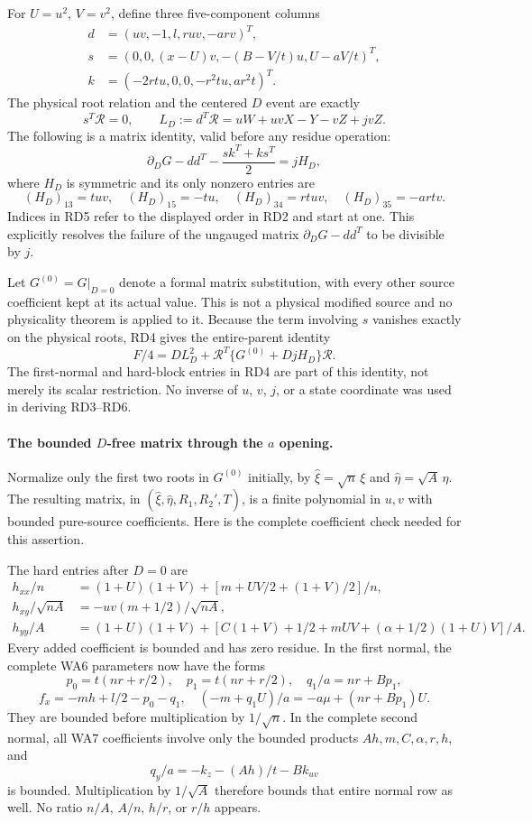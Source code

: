 For $U=u^2$, $V=v^2$, define three five-component columns
\begin{align*}
 d&=(uv,-1,l,ruv,-arv)^T,\\
 s&=(0,0,(x-U)v,-(B-V/t)u,U-aV/t)^T,\\
 k&=(-2rtu,0,0,-r^2tu,ar^2t)^T.
\end{align*}
The physical root relation and the centered $D$ event are exactly
\[
 s^T\mathcal R=0,\qquad
 L_D:=d^T\mathcal R
   =uW+uvX-Y-vZ+jvZ.                               \tag{RD3}
\]
The following is a matrix identity, valid before any residue operation:
\[
 \partial_DG-dd^T-\frac{sk^T+ks^T}{2}=jH_D,        \tag{RD4}
\]
where $H_D$ is symmetric and its only nonzero entries are
\[
 (H_D)_{13}=tuv,\quad (H_D)_{15}=-tu,\quad
 (H_D)_{34}=rtuv,\quad (H_D)_{35}=-artv.           \tag{RD5}
\]
Indices in RD5 refer to the displayed order in RD2 and start at one.
This explicitly resolves the failure of the ungauged matrix
$\partial_DG-dd^T$ to be divisible by $j$.

Let $G^{(0)}=G|_{D=0}$ denote a formal matrix substitution, with every
other source coefficient kept at its actual value. This is not a
physical modified source and no physicality theorem is applied to it.
Because the term involving $s$ vanishes exactly on the physical roots,
RD4 gives the entire-parent identity
\[
 F/4=D L_D^2+\mathcal R^T\{G^{(0)}+DjH_D\}\mathcal R.
                                                               \tag{RD6}
\]
The first-normal and hard-block entries in RD4 are part of this identity,
not merely its scalar restriction. No inverse of $u$, $v$, $j$, or a
state coordinate was used in deriving RD3--RD6.

\paragraph{The bounded $D$-free matrix through the $a$ opening.}
Normalize only the first two roots in $G^{(0)}$ initially, by
$\widehat\xi=\sqrt n\,\xi$ and $\widehat\eta=\sqrt A\,\eta$.
The resulting matrix, in
$(\widehat\xi,\widehat\eta,R_1,R_2',T)$, is a finite polynomial in
$u,v$ with bounded pure-source coefficients. Here is the complete
coefficient check needed for this assertion.

The hard entries after $D=0$ are
\begin{align*}
 h_{xx}/n&=(1+U)(1+V)+[m+UV/2+(1+V)/2]/n,\\
 h_{xy}/\sqrt{nA}&=-uv(m+1/2)/\sqrt{nA},\\
 h_{yy}/A&=(1+U)(1+V)
       +[C(1+V)+1/2+mUV+(\alpha+1/2)(1+U)V]/A.
\end{align*}
Every added coefficient is bounded and has zero residue.
In the first normal, the complete WA6 parameters now have the forms
\[
 p_0=t(nr+r/2),\quad p_1=t(nr+r/2),\quad
 q_1/a=nr+Bp_1,
\]
\[
 f_x=-mh+l/2-p_0-q_1,
 \quad (-m+q_1U)/a=-a\mu+(nr+Bp_1)U.
\]
They are bounded before multiplication by $1/\sqrt n$.
In the complete second normal, all WA7 coefficients involve only
the bounded products $Ah,m,C,\alpha,r,h$, and
\[
 q_y/a=-k_z-(Ah)/t-Bk_{uv}
\]
is bounded. Multiplication by $1/\sqrt A$ therefore bounds that
entire normal row as well. No ratio $n/A$, $A/n$, $h/r$, or $r/h$
appears.

